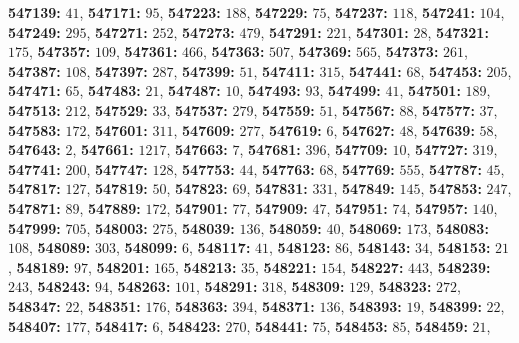 \textsf{\bfseries 547139:} $41$, \textsf{\bfseries 547171:} $95$, \textsf{\bfseries 547223:} $188$, \textsf{\bfseries 547229:} $75$, \textsf{\bfseries 547237:} $118$, \textsf{\bfseries 547241:} $104$, \textsf{\bfseries 547249:} $295$, \textsf{\bfseries 547271:} $252$, \textsf{\bfseries 547273:} $479$, \textsf{\bfseries 547291:} $221$, \textsf{\bfseries 547301:} $28$, \textsf{\bfseries 547321:} $175$, \textsf{\bfseries 547357:} $109$, \textsf{\bfseries 547361:} $466$, \textsf{\bfseries 547363:} $507$, \textsf{\bfseries 547369:} $565$, \textsf{\bfseries 547373:} $261$, \textsf{\bfseries 547387:} $108$, \textsf{\bfseries 547397:} $287$, \textsf{\bfseries 547399:} $51$, \textsf{\bfseries 547411:} $315$, \textsf{\bfseries 547441:} $68$, \textsf{\bfseries 547453:} $205$, \textsf{\bfseries 547471:} $65$, \textsf{\bfseries 547483:} $21$, \textsf{\bfseries 547487:} $10$, \textsf{\bfseries 547493:} $93$, \textsf{\bfseries 547499:} $41$, \textsf{\bfseries 547501:} $189$, \textsf{\bfseries 547513:} $212$, \textsf{\bfseries 547529:} $33$, \textsf{\bfseries 547537:} $279$, \textsf{\bfseries 547559:} $51$, \textsf{\bfseries 547567:} $88$, \textsf{\bfseries 547577:} $37$, \textsf{\bfseries 547583:} $172$, \textsf{\bfseries 547601:} $311$, \textsf{\bfseries 547609:} $277$, \textsf{\bfseries 547619:} $6$, \textsf{\bfseries 547627:} $48$, \textsf{\bfseries 547639:} $58$, \textsf{\bfseries 547643:} $2$, \textsf{\bfseries 547661:} $1217$, \textsf{\bfseries 547663:} $7$, \textsf{\bfseries 547681:} $396$, \textsf{\bfseries 547709:} $10$, \textsf{\bfseries 547727:} $319$, \textsf{\bfseries 547741:} $200$, \textsf{\bfseries 547747:} $128$, \textsf{\bfseries 547753:} $44$, \textsf{\bfseries 547763:} $68$, \textsf{\bfseries 547769:} $555$, \textsf{\bfseries 547787:} $45$, \textsf{\bfseries 547817:} $127$, \textsf{\bfseries 547819:} $50$, \textsf{\bfseries 547823:} $69$, \textsf{\bfseries 547831:} $331$, \textsf{\bfseries 547849:} $145$, \textsf{\bfseries 547853:} $247$, \textsf{\bfseries 547871:} $89$, \textsf{\bfseries 547889:} $172$, \textsf{\bfseries 547901:} $77$, \textsf{\bfseries 547909:} $47$, \textsf{\bfseries 547951:} $74$, \textsf{\bfseries 547957:} $140$, \textsf{\bfseries 547999:} $705$, \textsf{\bfseries 548003:} $275$, \textsf{\bfseries 548039:} $136$, \textsf{\bfseries 548059:} $40$, \textsf{\bfseries 548069:} $173$, \textsf{\bfseries 548083:} $108$, \textsf{\bfseries 548089:} $303$, \textsf{\bfseries 548099:} $6$, \textsf{\bfseries 548117:} $41$, \textsf{\bfseries 548123:} $86$, \textsf{\bfseries 548143:} $34$, \textsf{\bfseries 548153:} $21$, \textsf{\bfseries 548189:} $97$, \textsf{\bfseries 548201:} $165$, \textsf{\bfseries 548213:} $35$, \textsf{\bfseries 548221:} $154$, \textsf{\bfseries 548227:} $443$, \textsf{\bfseries 548239:} $243$, \textsf{\bfseries 548243:} $94$, \textsf{\bfseries 548263:} $101$, \textsf{\bfseries 548291:} $318$, \textsf{\bfseries 548309:} $129$, \textsf{\bfseries 548323:} $272$, \textsf{\bfseries 548347:} $22$, \textsf{\bfseries 548351:} $176$, \textsf{\bfseries 548363:} $394$, \textsf{\bfseries 548371:} $136$, \textsf{\bfseries 548393:} $19$, \textsf{\bfseries 548399:} $22$, \textsf{\bfseries 548407:} $177$, \textsf{\bfseries 548417:} $6$, \textsf{\bfseries 548423:} $270$, \textsf{\bfseries 548441:} $75$, \textsf{\bfseries 548453:} $85$, \textsf{\bfseries 548459:} $21$, 
